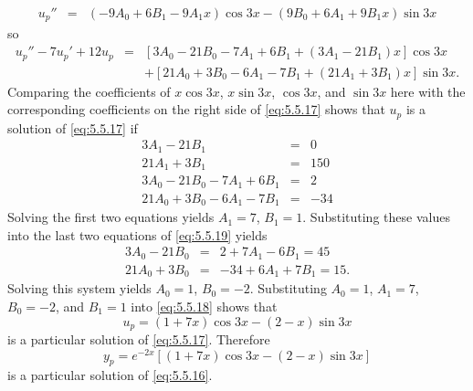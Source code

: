 \documentclass{ximera}
\begin{document}
\begin{example}
\begin{explanation}
\begin{eqnarray*}
u_p''&=&(-9A_0+6B_1-9A_1x)\cos 3x-(9B_0+6A_1+9B_1x)\sin 3x
\end{eqnarray*}
so
\begin{eqnarray*}
u_p''-7u_p'+12u_p&=&\left[3A_0-21B_0-7A_1+6B_1+(3A_1-21B_1)x\right]\cos
3x\\ &&+\left[21A_0+3B_0-6A_1-7B_1+(21A_1+3B_1)x\right]\sin 3x.
\end{eqnarray*}
Comparing the coefficients of $x\cos 3x$, $x\sin 3x$, $\cos 3x$, and
$\sin 3x$ here with the corresponding coefficients on the right side
of \eqref{eq:5.5.17} shows that $u_p$ is a solution of \eqref{eq:5.5.17} if
\begin{equation} \label{eq:5.5.19}
\begin{array}{rcr}
3A_1-21B_1&=&0\\
21A_1+3B_1&=&150\\
3A_0-21B_0-7A_1+6B_1&=&2\\
21A_0+3B_0-6A_1-7B_1&=&-34
\end{array}
\end{equation}
Solving the first two equations yields $A_1=7$, $B_1=1$.
Substituting these values into the last two equations of \eqref{eq:5.5.19}
yields
\begin{eqnarray*}
3A_0-21B_0&=&2+7A_1-6B_1=45\\
21A_0+3B_0&=&-34+6A_1+7B_1=15.
\end{eqnarray*}
Solving this system  yields  $A_0=1$, $B_0=-2$.
Substituting $A_0=1$, $A_1=7$, $B_0=-2$, and $B_1=1$ into
\eqref{eq:5.5.18} shows that
$$
u_p=(1+7x)\cos 3x-(2-x)\sin 3x
$$
is a particular solution of  \eqref{eq:5.5.17}. Therefore
$$
y_p=e^{-2x}\left[(1+7x)\cos 3x-(2-x)\sin 3x\right]
$$
is a particular solution of   \eqref{eq:5.5.16}.
\end{explanation}
\end{example}
\end{document}
